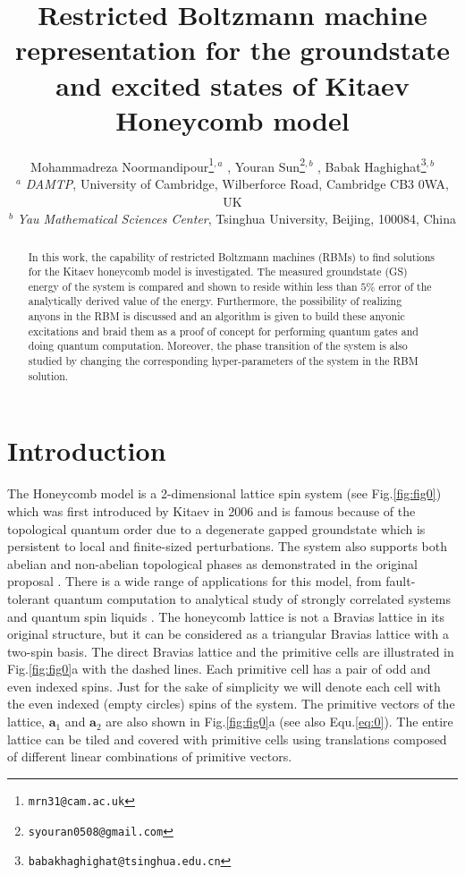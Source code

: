\documentclass{article}
\title{Restricted Boltzmann machine representation for the groundstate and excited states of Kitaev Honeycomb model}
\author{
    Mohammadreza Noormandipour\thanks{\texttt{mrn31@cam.ac.uk}}\hspace{1mm}$^{,a}$ , Youran Sun\thanks{\texttt{syouran0508@gmail.com}}\hspace{1mm}$^{,b}$ , Babak Haghighat\thanks{\texttt{babakhaghighat@tsinghua.edu.cn}}\hspace{1mm}$^{,b}$ \\
	$^{a}$ \textit{DAMTP}, University of Cambridge, Wilberforce Road, Cambridge CB3 0WA, UK \\
	$^{b}$ \textit{Yau Mathematical Sciences Center}, Tsinghua University, Beijing, 100084, China\\
}
\begin{document}
\maketitle

\begin{abstract}
In this work, the capability of restricted Boltzmann machines (RBMs) to find solutions for the Kitaev honeycomb model is investigated. The measured groundstate (GS) energy of the system is compared and shown to reside within less than $5\%$ error of the analytically derived value of the energy. Furthermore, the possibility of realizing anyons in the RBM is discussed and an algorithm is given to build these anyonic excitations and braid them as a proof of concept for performing quantum gates and doing quantum computation. Moreover, the phase transition of the system is also studied by changing the corresponding hyper-parameters of the system in the RBM solution.
\end{abstract}




\section{Introduction}
The Honeycomb model is a 2-dimensional lattice spin system (see Fig.\hspace{0.2mm}\ref{fig:fig0}) which was first introduced by Kitaev in 2006 \cite{Kitaev_2006} and is famous because of the topological quantum order due to a degenerate gapped groundstate which is persistent to local and finite-sized perturbations. The system also supports both abelian and non-abelian topological phases as demonstrated in the original proposal \cite{Kitaev_2006}. There is a wide range of applications for this model, from fault-tolerant quantum computation \cite{Kitaev_2003} to analytical study of strongly correlated systems \cite{Jackeli_2009} and quantum spin liquids \cite{Tikhonov_2011}. The honeycomb lattice is not a Bravias lattice in its original structure, but it can be considered as a triangular Bravias lattice with a two-spin basis. The direct Bravias lattice and the primitive cells are illustrated in Fig.\hspace{0.2mm}\ref{fig:fig0}a with the dashed lines. Each primitive cell has a pair of odd and even indexed spins. Just for the sake of simplicity we will denote each cell with the even indexed (empty circles) spins of the system. The primitive vectors of the lattice, $\textbf{a}_1$ and $\textbf{a}_2$ are also shown in Fig.\hspace{0.2mm}\ref{fig:fig0}a (see also Equ.\hspace{0.2mm}\ref{eq:0}). The entire lattice can be tiled and covered with primitive cells using translations composed of different linear combinations of primitive vectors. 
\end{document}
